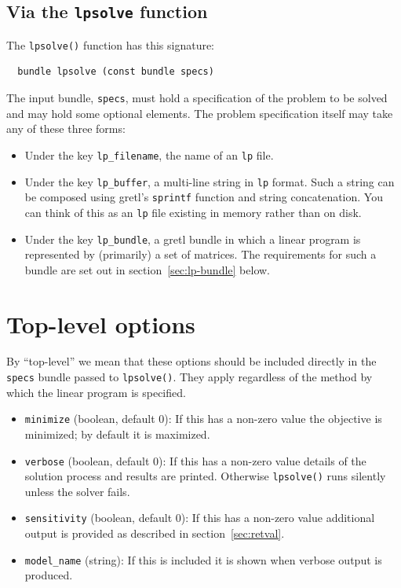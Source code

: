 \documentclass{article}
\begin{document}
\subsection{Via the \texttt{lpsolve} function}

The \texttt{lpsolve()} function has this signature:
\begin{verbatim}
  bundle lpsolve (const bundle specs)
\end{verbatim}

The input bundle, \texttt{specs}, must hold a specification of the
problem to be solved and may hold some optional elements.  The
problem specification itself may take any of these three forms:
\begin{itemize}
\item Under the key \texttt{lp\_filename}, the name of an \texttt{lp}
  file.
\item Under the key \texttt{lp\_buffer}, a multi-line string in
  \texttt{lp} format. Such a string can be composed using gretl's
  \texttt{sprintf} function and string concatenation. You can think of
  this as an \texttt{lp} file existing in memory rather than on disk.
\item Under the key \texttt{lp\_bundle}, a gretl bundle in which a
  linear program is represented by (primarily) a set of matrices. The
  requirements for such a bundle are set out in
  section~\ref{sec:lp-bundle} below.
\end{itemize}

\section{Top-level options}
\label{sec:gen-opts}

By ``top-level'' we mean that these options should be included
directly in the \texttt{specs} bundle passed to
\texttt{lpsolve()}. They apply regardless of the method by which the
linear program is specified.

\begin{itemize}
\item \texttt{minimize} (boolean, default 0): If this has a non-zero
  value the objective is minimized; by default it is maximized.  
\item \texttt{verbose} (boolean, default 0): If this has a non-zero
  value details of the solution process and results are
  printed. Otherwise \texttt{lpsolve()} runs silently unless the
  solver fails.
\item \texttt{sensitivity} (boolean, default 0): If this has a
  non-zero value additional output is provided as described in
  section~\ref{sec:retval}.
\item \texttt{model\_name} (string): If this is included it is shown
  when verbose output is produced.
\end{itemize}
\end{document}
